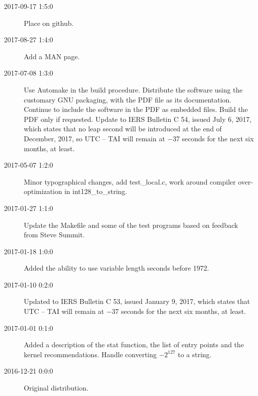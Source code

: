 \documentclass[letterpaper,twoside]{article}
\begin{document}
\begin{description}
\item[2017-09-17 1:5:0] Place on github.
\item[2017-08-27 1:4:0] Add a MAN page.
\item[2017-07-08 1:3:0] Use Automake in the build procedure.
  Distribute the software using the customary GNU packaging,
  with the PDF file as its documentation.  Continue to include
  the software in the PDF as embedded files.  Build the PDF
  only if requested.  Update to IERS Bulletin C 54, issued
  July 6, 2017, which states that no leap second will be introduced
  at the end of December, 2017, so UTC -- TAI will remain at
  \num{-37} seconds for the next six months, at least.
\item[2017-05-07 1:2:0] Minor typographical changes, add test\_local.c,
  work around compiler over-optimization in int128\_to\_string.
\item[2017-01-27 1:1:0] Update the Makefile and some of the test programs
  based on feedback from Steve Summit.
\item[2017-01-18 1:0:0] Added the ability to use variable length seconds
  before 1972.
\item[2017-01-10 0:2:0] Updated to IERS Bulletin C 53,
  issued January 9, 2017, which states that UTC -- TAI
  will remain at \num{-37} seconds for the next six months, at least.
\item[2017-01-01 0:1:0] Added a description of the stat function,
  the list of entry points and the kernel recommendations.
  Handle converting $-2^{127}$ to a string. 
\item[2016-12-21 0:0:0] Original distribution.
\end{description}


\end{document}
